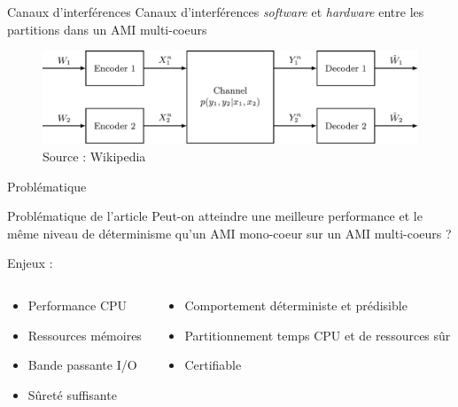 \documentclass{beamer}
\begin{document}
\begin{frame}{Canaux d'interférences}
	Canaux d'interférences \textit{software} et \textit{hardware} entre les partitions
	dans un AMI multi-coeurs
	\bigskip
	\begin{figure}
		\centering
		\includegraphics[width=\linewidth]{Interference_channel_model.pdf}
		\caption{Source : Wikipedia \cite{wiki:Interference_channel}}
		\label{fig:Interference_channel_model}
	\end{figure}
\end{frame}


\begin{frame}{Problématique} 

	\begin{block}{Problématique de l'article}
	Peut-on atteindre une meilleure performance et le même niveau de déterminisme qu'un AMI mono-coeur sur un 
	AMI multi-coeurs ?
	\end{block}

	  Enjeux : \pause
  \begin{columns}
	  \begin{column}{0.45\textwidth}
		  \begin{itemize}
		  	\item Performance CPU \pause
			\item Ressources mémoires\pause
			\item Bande passante I/O \pause
			\item Sûreté suffisante \pause
		  \end{itemize}
	  \end{column}
	  \begin{column}{0.45\textwidth}
		  \begin{itemize}
			  \item Comportement déterministe et prédisible \pause
		      \item Partitionnement temps CPU et de ressources sûr \pause
			  \item Certifiable
		  \end{itemize}
	  \end{column}
  \end{columns}
 
\end{frame}
\end{document}
